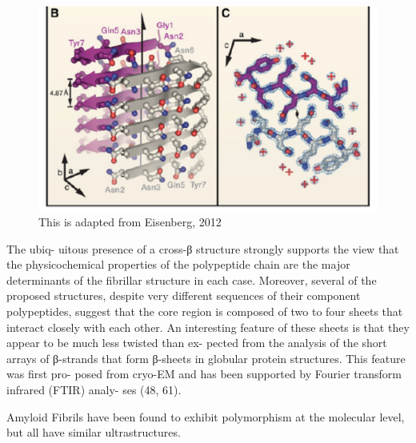 \begin{figure}
  \centering
  \includegraphics[width=6in]{figures/introduction/fibril_xray_model.pdf}
  \caption[Characteristic cross-$\beta$ spacings from X-ray fibre diffraction studies of amyloid fibrils]{This is adapted from Eisenberg, 2012}
  \label{fig:fibril_xray_model}
\end{figure}


The ubiq- uitous presence of a cross-β structure strongly supports the view that the physicochemical properties of the polypeptide chain are the major determinants of the fibrillar structure in each case. Moreover, several of the proposed structures, despite very different sequences of their component polypeptides, suggest that the core region is composed of two to four sheets that interact closely with each other. An interesting feature of these sheets is that they appear to be much less twisted than ex- pected from the analysis of the short arrays of β-strands that form β-sheets in globular protein structures. This feature was first pro- posed from cryo-EM and has been supported by Fourier transform infrared (FTIR) analy- ses (48, 61).


Amyloid Fibrils have been found to exhibit polymorphism at the molecular level, but all have similar ultrastructures.  %


